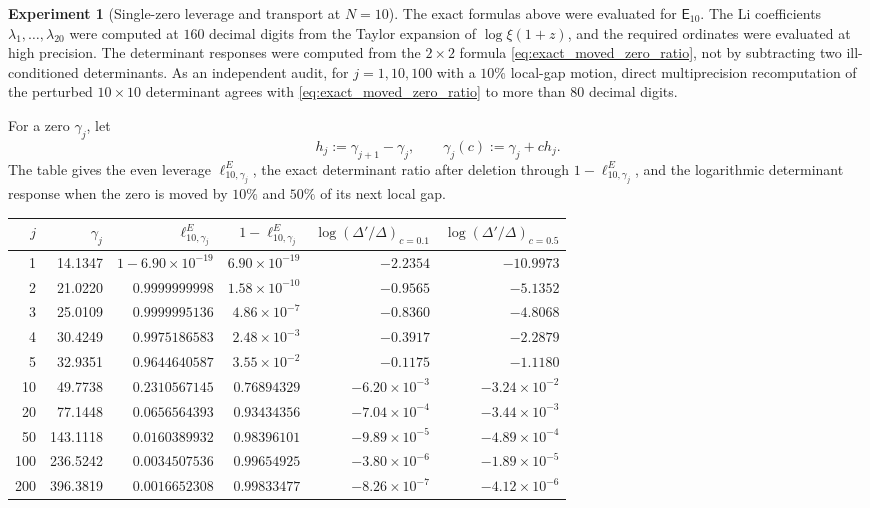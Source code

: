 \documentclass[11pt]{amsart}
\numberwithin{equation}{section}
\theoremstyle{plain}
\theoremstyle{definition}
\newtheorem{experiment}[theorem]{Experiment}
\theoremstyle{remark}
\newcommand{\E}{\mathsf E}
\begin{document}
\begin{experiment}[Single-zero leverage and transport at $N=10$]
\label{exp:single_zero_transport}
The exact formulas above were evaluated for $\E_{10}$.  The Li coefficients $\lambda_1,\ldots,\lambda_{20}$ were computed at $160$ decimal digits from the Taylor expansion of $\log\xi(1+z)$, and the required ordinates were evaluated at high precision.  The determinant responses were computed from the $2\times2$ formula \eqref{eq:exact_moved_zero_ratio}, not by subtracting two ill-conditioned determinants.  As an independent audit, for $j=1,10,100$ with a $10\%$ local-gap motion, direct multiprecision recomputation of the perturbed $10\times10$ determinant agrees with \eqref{eq:exact_moved_zero_ratio} to more than $80$ decimal digits.

For a zero $\gamma_j$, let
\begin{equation}
h_j:=\gamma_{j+1}-\gamma_j,
\qquad
\gamma_j(c):=\gamma_j+c h_j.
\label{eq:local_gap_transport}
\end{equation}
The table gives the even leverage $\ell_{10,\gamma_j}^E$, the exact determinant ratio after deletion through $1-\ell_{10,\gamma_j}^E$, and the logarithmic determinant response when the zero is moved by $10\%$ and $50\%$ of its next local gap.

\begin{center}
\small
\begin{tabular}{rrrrrr}
\toprule
$j$ & $\gamma_j$ & $\ell_{10,\gamma_j}^E$ & $1-\ell_{10,\gamma_j}^E$
& $\log(\Delta'/\Delta)_{c=0.1}$ & $\log(\Delta'/\Delta)_{c=0.5}$\\
\midrule
1   & 14.1347  & $1-6.90\times10^{-19}$ & $6.90\times10^{-19}$ & $-2.2354$ & $-10.9973$\\
2   & 21.0220  & $0.9999999998$ & $1.58\times10^{-10}$ & $-0.9565$ & $-5.1352$\\
3   & 25.0109  & $0.9999995136$ & $4.86\times10^{-7}$ & $-0.8360$ & $-4.8068$\\
4   & 30.4249  & $0.9975186583$ & $2.48\times10^{-3}$ & $-0.3917$ & $-2.2879$\\
5   & 32.9351  & $0.9644640587$ & $3.55\times10^{-2}$ & $-0.1175$ & $-1.1180$\\
10  & 49.7738  & $0.2310567145$ & $0.76894329$ & $-6.20\times10^{-3}$ & $-3.24\times10^{-2}$\\
20  & 77.1448  & $0.0656564393$ & $0.93434356$ & $-7.04\times10^{-4}$ & $-3.44\times10^{-3}$\\
50  & 143.1118 & $0.0160389932$ & $0.98396101$ & $-9.89\times10^{-5}$ & $-4.89\times10^{-4}$\\
100 & 236.5242 & $0.0034507536$ & $0.99654925$ & $-3.80\times10^{-6}$ & $-1.89\times10^{-5}$\\
200 & 396.3819 & $0.0016652308$ & $0.99833477$ & $-8.26\times10^{-7}$ & $-4.12\times10^{-6}$\\
\bottomrule
\end{tabular}
\end{center}


\end{experiment}
\end{document}
